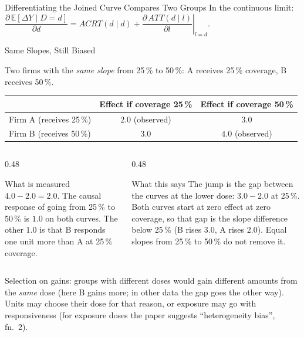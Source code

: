\documentclass[main.tex]{subfiles}
\begin{document}
\begin{frame}{Differentiating the Joined Curve Compares Two Groups}
  \smallskip
  \footnotesize In the continuous limit:
  $\dfrac{\partial\, \mathbb{E}[\Delta Y\mid D=d]}{\partial d}
   = ACRT(d\mid d) + \left.\dfrac{\partial\, ATT(d\mid l)}{\partial l}\right|_{l=d}$.

\end{frame}

\begin{frame}{Same Slopes, Still Biased}

  Two firms with the \emph{same slope} from 25\,\% to 50\,\%: A receives
  25\,\% coverage, B receives 50\,\%.

  \medskip
  \begin{center}\small
  \begin{tabular}{@{}lcc@{}}
    \toprule
     & Effect if coverage 25\,\% & Effect if coverage 50\,\% \\
    \midrule
    Firm A (receives 25\,\%) & $\mathbf{2.0}$ (observed) & $3.0$ \\
    Firm B (receives 50\,\%) & $3.0$ & $\mathbf{4.0}$ (observed) \\
    \bottomrule
  \end{tabular}
  \end{center}

  \medskip
  \begin{columns}[T]
    \begin{column}{0.48\textwidth}
      \begin{block}{\footnotesize What is measured}
        \footnotesize
        $4.0 - 2.0 = 2.0$. The causal response of going from 25\,\% to
        50\,\% is $1.0$ on both curves. The other $1.0$ is that B responds
        one unit more than A at 25\,\% coverage.
      \end{block}
    \end{column}
    \begin{column}{0.48\textwidth}
      \begin{block}{\footnotesize What this says}
        \footnotesize
        The jump is the gap between the curves at the lower dose: $3.0 - 2.0$
        at 25\,\%. Both curves start at zero effect at zero coverage, so that
        gap is the slope difference below 25\,\% (B rises $3.0$, A rises
        $2.0$). Equal slopes from 25\,\% to 50\,\% do not remove it.
      \end{block}
    \end{column}
  \end{columns}

  \medskip
  \footnotesize Selection on gains: groups with different doses would gain
  different amounts from the \emph{same} dose (here B gains more; in other data
  the gap goes the other way). Units may choose their dose for that reason, or
  exposure may go with responsiveness (for exposure doses the paper suggests
  ``heterogeneity bias'', fn.~2).

\end{frame}
\end{document}
